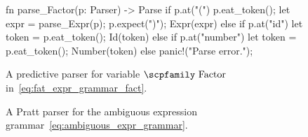 \documentclass[
  oneside,
  english,
  coorientadorbanca,
  noabntexcite
]{ufsc-thesis-rn46-2019}
\newcommand{\codett}[1]{\text{\scpfamily#1}}
\newcommand{\bnfvar}[1]{\codett{#1}}
\begin{document}
\begin{figure}[ht]
  \centering
  \begin{minipage}{0.5\textwidth}
    \begin{rustcode}
fn parse_Factor(p: Parser) -> Parse {
  if p.at("(") {
    p.eat_token();
    let expr = parse_Expr(p);
    p.expect(")");
    Expr(expr)
  } else if p.at("id") {
    let token = p.eat_token();
    Id(token)
  } else if p.at("number") {
    let token = p.eat_token();
    Number(token)
  } else {
    panic!("Parse error.");
  }
}
    \end{rustcode}
  \end{minipage}
  \caption{
    A predictive parser for variable $\bnfvar{Factor}$ in~\eqref{eq:fat_expr_grammar_fact}.
  }\label{fig:predictive_parser_fact}
\end{figure}

\begin{figure}
  \centering
  \begin{minipage}{0.9\textwidth}
  \end{minipage}
  \caption{
    A Pratt parser for the ambiguous expression grammar~\eqref{eq:ambiguous_expr_grammar}.
  }\label{fig:pratt_parser_expr_grammar}
\end{figure}
\end{document}
